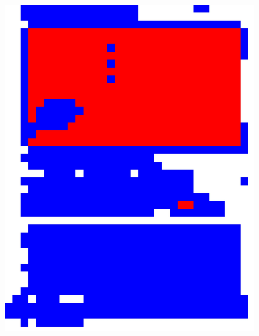 \documentclass{book}
\begin{document}
\begin{figure}[H]
\begin{center}
\includegraphics[scale=0.06]{images/rect_1_res_hog_hsv_kmeans.jpg}

\end{center}
\end{figure}
\end{document}

